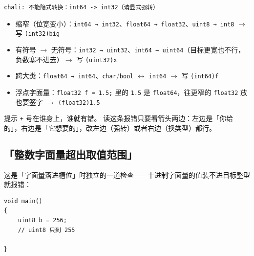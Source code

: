 \par
\medskip
\begin{lstlisting}[style=out]
chali: 不能隐式转换：int64 -> int32（请显式强转）
\end{lstlisting}
\par
\medskip

\begin{itemize}

\item 缩窄（位宽变小）：\texttt{int64 → int32}、\texttt{float64 → float32}、\texttt{uint8 → int8} \ensuremath{\rightarrow} 写 \texttt{(\allowbreak{}int32)\allowbreak{}big}

\item 有符号 \ensuremath{\rightarrow} 无符号：\texttt{int32 → uint32}、\texttt{int64 → uint64}（目标更宽也不行，负数塞不进去）\ensuremath{\rightarrow} 写 \texttt{(\allowbreak{}uint32)\allowbreak{}x}

\item 跨大类：\texttt{float64 → int64}、\texttt{char}/\texttt{bool} \ensuremath{\leftrightarrow} \texttt{int64} \ensuremath{\rightarrow} 写 \texttt{(\allowbreak{}int64)\allowbreak{}f}

\item 浮点字面量：\texttt{float32 f =\allowbreak{} 1.\allowbreak{}5;} 里的 \texttt{1.\allowbreak{}5} 是 \texttt{float64}，往更窄的 \texttt{float32} 放也要签字 \ensuremath{\rightarrow} \texttt{(\allowbreak{}float32)\allowbreak{}1.\allowbreak{}5}

\end{itemize}

\begin{tip}{提示}
\texttt{+} 号在谁身上，谁就有错。 读这条报错只要看箭头两边：左边是「你给的」，右边是「它想要的」，改左边（强转）或者右边（换类型）都行。
\end{tip}

\subsection{「整数字面量超出取值范围」}

这是「字面量落进槽位」时独立的一道检查——十进制字面量的值装不进目标整型就报错：

\par
\medskip
\begin{lstlisting}[style=chali]
void main()
{
    uint8 b = 256;
    // uint8 只到 255

}
\end{lstlisting}
\par
\medskip

